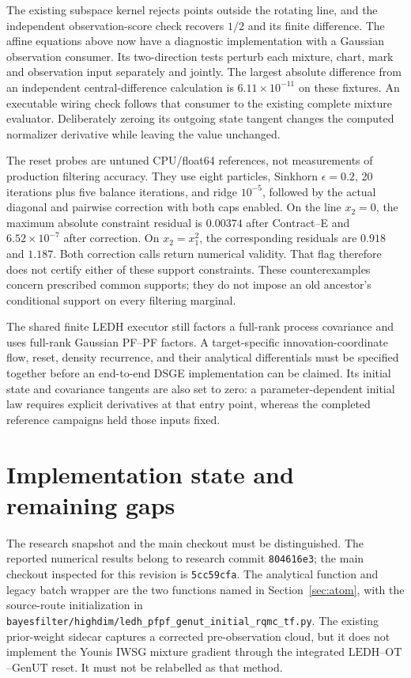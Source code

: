 \documentclass[11pt]{article}
\newcommand{\LEDH}{\ensuremath{\mathrm{LEDH}}}
\newcommand{\GenUT}{\ensuremath{\mathrm{GenUT}}}
\newcommand{\OT}{\ensuremath{\mathrm{OT}}}
\begin{document}
The existing subspace kernel rejects points outside the rotating line,
and the independent observation-score check
recovers $1/2$ and its finite difference.  The affine equations above now have
a diagnostic implementation with a Gaussian observation consumer.  Its
two-direction tests perturb each mixture, chart, mark and observation input
separately and jointly.  The largest absolute difference from an independent
central-difference calculation is $6.11\times10^{-11}$ on these fixtures.
An executable wiring check follows that consumer to the existing complete
mixture evaluator.  Deliberately zeroing its outgoing state tangent changes
the computed normalizer derivative while leaving the value unchanged.

The reset probes are untuned CPU/float64 references, not measurements of
production filtering accuracy.  They use eight particles, Sinkhorn
$\epsilon=0.2$, 20 iterations plus five balance iterations, and ridge
$10^{-5}$, followed by the actual diagonal and pairwise correction with both
caps enabled.  On the line $x_2=0$, the maximum absolute constraint residual
is $0.00374$ after Contract--E and $6.52\times10^{-7}$ after correction.  On
$x_2=x_1^2$, the corresponding residuals are $0.918$ and $1.187$.  Both
correction calls return numerical validity.  That flag therefore does not
certify either of these support constraints.  These counterexamples concern
prescribed common supports; they do not impose an old ancestor's conditional
support on every filtering marginal.

The shared finite
LEDH executor still factors a full-rank process covariance and uses full-rank
Gaussian PF--PF factors.  A target-specific innovation-coordinate flow,
reset, density recurrence, and their analytical differentials must be
specified together before an end-to-end DSGE implementation can be claimed.
Its initial state and covariance tangents are also set to zero: a
parameter-dependent initial law requires explicit derivatives at that entry
point, whereas the completed reference campaigns held those inputs fixed.

\section{Implementation state and remaining gaps}
\label{sec:implementation}

The research snapshot and the main checkout must be distinguished. The
reported numerical results belong to research commit \texttt{804616e3}; the
main checkout inspected for this revision is \texttt{5cc59cfa}. The analytical
function and legacy batch wrapper are the two functions named in
Section~\ref{sec:atom}, with the source-route initialization in
\texttt{bayesfilter/highdim/ledh\_pfpf\_genut\_initial\_rqmc\_tf.py}.  The
existing prior-weight sidecar captures a corrected pre-observation cloud, but
it does not implement the Younis IWSG mixture gradient through the integrated
\LEDH{}--\OT{}--\GenUT{} reset.  It must not be relabelled as that method.
\end{document}
